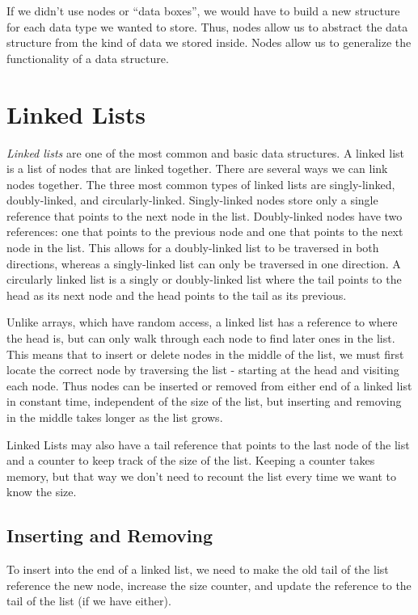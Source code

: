 If we didn't use nodes or ``data boxes'', we would have to build a new structure for each data type we wanted to store.
Thus, nodes allow us to abstract the data structure from the kind of data we stored inside.
Nodes allow us to generalize the functionality of a data structure.

\section*{Linked Lists}
\emph{Linked lists} are one of the most common and basic data structures.
A linked list is a list of nodes that are linked together.
There are several ways we can link nodes together.
The three most common types of linked lists are singly-linked, doubly-linked, and circularly-linked.
Singly-linked nodes store only a single reference that points to the next node in the list.
Doubly-linked nodes have two references:
one that points to the previous node and one that points to the next node in the list.
This allows for a doubly-linked list to be traversed in both directions, whereas a singly-linked list can only be traversed in one direction.
A circularly linked list is a singly or doubly-linked list where the tail points to the head as its next node and the head points to the tail as its previous.


Unlike arrays, which have random access, a
linked list has a reference to where the head is, but can only walk through each node to find later ones in the list.
This means that to insert or delete nodes in the middle of the list, we must first locate the correct node by traversing the list - starting at the head and visiting each node.
Thus nodes can be inserted or removed from either end of a linked list in constant time, independent of the size of the list, but inserting and removing in the middle takes longer as the list grows.

Linked Lists may also have a tail reference that points to the last node of the list and a counter to keep track of the size of the list.
Keeping a counter takes memory, but that way we don't need to recount the list every time we want to know the size.


\subsection*{Inserting and Removing}

To insert into the end of a linked list, we need to make the old tail of the list reference the new node, increase the size counter, and update the reference to the tail of the list (if we have either).

